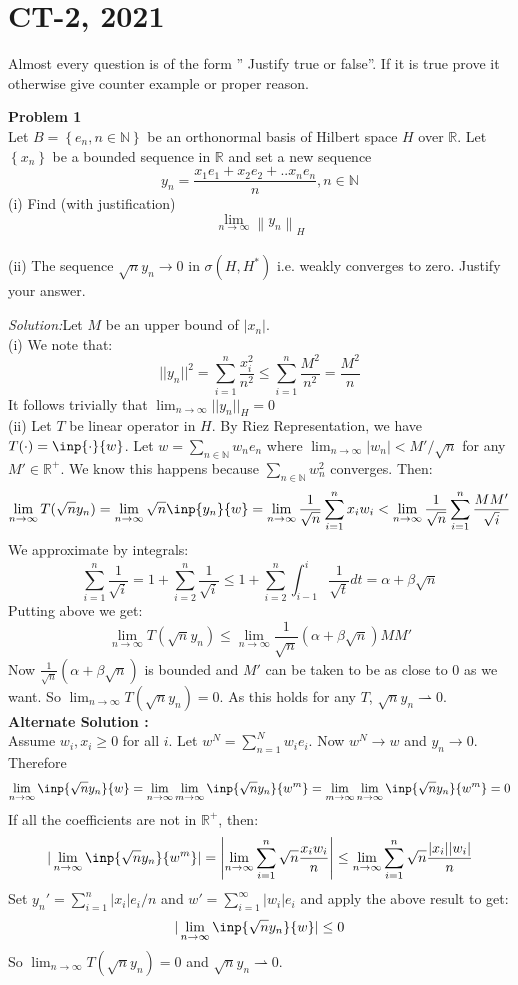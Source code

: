 \documentclass[a4paper, 11pt]{article}
\newenvironment{problem}[2][Problem]
    { \begin{mdframed}[backgroundcolor=gray!20] \textbf{#1 #2} \\}
    {  \end{mdframed}}
\newenvironment{solution}
    {\textit{Solution:}}
    {}
\begin{document}
\section{CT-2, 2021}
Almost every question is of the form ” Justify true or false”. If it is true prove
it otherwise give counter example or proper reason.
\begin{problem}{1}
    Let $B=\left\{e_{n}, n \in \mathbb{N}\right\}$ be an orthonormal basis of Hilbert space $H$ over $\mathbb{R}$. Let $\left\{x_{n}\right\}$ be a bounded sequence in $\mathbb{R}$ and set a new sequence
$$y_{n}=\frac{x_{1} e_{1}+x_{2} e_{2}+. . x_{n} e_{n}}{n}, n \in \mathbb{N} $$
(i) Find (with justification) $$ \lim _{n \longrightarrow \infty}\left\|y_{n}\right\|_{H}$$\  \\
(ii) The sequence $\sqrt{n} y_{n} \rightarrow 0$ in $\sigma\left(H, H^{*}\right)$ i.e. weakly converges to zero. Justify your answer.
\end{problem}
\begin{solution}Let $M$ be an upper bound of $|x_n|$.\\
(i) We note that:
$$||y_n||^2=\sum_{i=1}^n\frac{x_i^2}{n^2}\leq\sum_{i=1}^n\frac{M^2}{n^2}=\frac{M^2}{n}$$
It follows trivially that $\lim_{n\to\infty}||y_n||_{H}=0$\\
(ii) Let $T$ be linear operator in $H$. By Riez Representation, we have $T(\cdot)=\inp{\cdot}{w}$. Let $w=\sum_{n\in\mathbb N}w_ne_n$ where $\lim_{n\to\infty }|w_n|< M'/\sqrt{n}$ for any $M'\in\mathbb R^+$. We know this happens because $\sum_{n\in\mathbb{N}}w_n^2$ converges. Then:
$$\lim_{n\to\infty}T(\sqrt n y_n)=\lim_{n\to\infty}\sqrt{n}\inp{y_n}{w}=\lim_{n\to\infty}\frac{1}{\sqrt{n}}\sum_{i=1}^nx_iw_i<\lim_{n\to\infty}\frac{1}{\sqrt{n}}\sum_{i=1}^n\frac{MM'}{\sqrt{i}}$$
We approximate by integrals:
$$\sum_{i=1}^n\frac{1}{\sqrt{i}}= 1+\sum_{i=2}^n\frac{1}{\sqrt{i}}\leq 1+\sum_{i=2}^n\int_{i-1}^i\frac{1}{\sqrt{t}}dt=\alpha+\beta\sqrt n $$
Putting above we get: 
$$\lim_{n\to\infty}T(\sqrt ny_n)\leq \lim_{n\to\infty} \frac{1}{\sqrt{n}}(\alpha+\beta \sqrt{n})MM'$$
Now $\frac{1}{\sqrt{n}}(\alpha+\beta \sqrt{n})$ is bounded and $M'$ can be taken to be as close to 0 as we want. So $\lim_{n\to\infty}T(\sqrt ny_n)=0$. As this holds for any $T$, $\sqrt ny_n\rightharpoonup 0$.\\
\textbf{Alternate Solution :}\\
Assume $w_i,x_i\geq 0$ for all $i$. Let $w^N=\sum_{n=1}^Nw_ie_i$. Now $w^N\to w$ and $y_n\to 0$. Therefore
$$\lim_{n\to \infty}\inp{\sqrt n y_n}{w}=\lim_{n\to \infty}\lim_{m\to \infty}\inp{\sqrt n y_n}{w^m}=\lim_{m\to \infty}\lim_{n\to \infty}\inp{\sqrt n y_n}{w^m}=0$$
If all the coefficients are not in $\mathbb R^+$, then:
$$|\lim_{n\to\infty}\inp{\sqrt ny_n}{w^m}|=\left|\lim_{n\to\infty}\sum_{i=1}^n\sqrt n\frac{x_iw_i}{n}\right|\leq \lim_{n\to\infty}\sum_{i=1}^n\sqrt n\frac{|x_i||w_i|}{n}$$
Set $y_n'=\sum_{i=1}^n |x_i|e_i/n$ and $w'=\sum_{i=1}^\infty |w_i|e_i$ and apply the above result to get:
$$|\lim_{n\to\infty}\inp{\sqrt ny_n}{w}|\leq 0$$
So $\lim_{n\to\infty}T(\sqrt ny_n)=0$ and $\sqrt ny_n\rightharpoonup 0$.
\end{solution}
\end{document}
